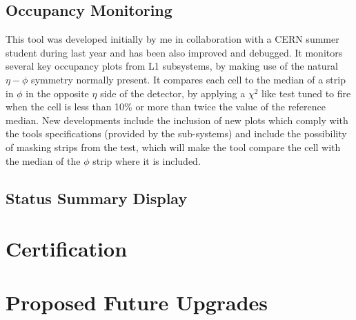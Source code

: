 \subsection{Occupancy Monitoring}

This tool was developed initially by me in collaboration with a CERN summer student during last year and has been
also improved and debugged. It monitors several key occupancy plots from L1 subsystems, by making use of the natural
$\eta-\phi$ symmetry normally present. It compares each cell to the median of a strip in $\phi$ in the opposite $\eta$
side of the detector, by applying a $\chi^{2}$ like test tuned to fire when the cell is less than 10\% or more than
twice the value of the reference median. New developments include the inclusion of new plots which comply with the
tools specifications (provided by the sub-systems) and include the possibility of masking strips from the test, which 
will make the tool compare the cell with the median of the $\phi$ strip where it is included.


\subsection{Status Summary Display}

\section{Certification}

\section{Proposed Future Upgrades}
